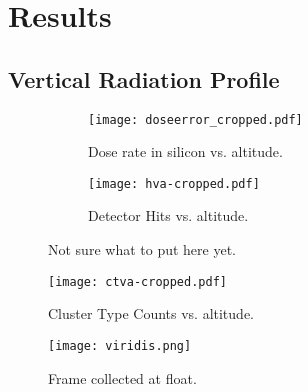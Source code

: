 \section{Results}
\label{Results}

\subsection{Vertical Radiation Profile}
\begin{figure}[H]
\centering
\begin{subfigure}{.5\textwidth}
  \centering
  \texttt{[image: doseerror\_cropped.pdf]}
  \caption{Dose rate in silicon vs. altitude.}
  \label{fig:sub1}
\end{subfigure}%
\begin{subfigure}{.5\textwidth}
  \centering
  \texttt{[image: hva-cropped.pdf]}
  \caption{Detector Hits vs. altitude.}
  \label{fig:sub2}
\end{subfigure}
\caption{Not sure what to put here yet.}
\label{fig:test}
\end{figure}

\begin{figure}[H]
\centering
\texttt{[image: ctva-cropped.pdf]}
\caption{Cluster Type Counts vs. altitude.}
\end{figure}

\begin{figure}[H]
\centering
\texttt{[image: viridis.png]}
\caption{Frame collected at float.}
\end{figure}
